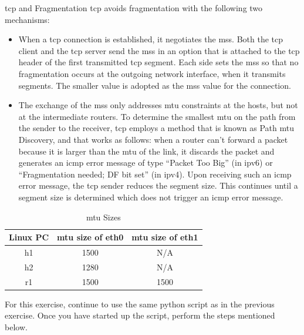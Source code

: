 \begin{exercise}{\ac{tcp} and Fragmentation}
\ac{tcp} avoids fragmentation with the following two mechanisms:

\begin{itemize}
	\item When a \ac{tcp} connection is established, it negotiates the \acf{mss}. Both the \ac{tcp} client and the \ac{tcp} server send the \ac{mss} in an option that is attached to the \ac{tcp} header of the first transmitted \ac{tcp} segment. Each side sets the \ac{mss} so that no fragmentation occurs at the outgoing network interface, when it transmits segments. The smaller value is adopted as the \ac{mss} value for the connection.
	\item The exchange of the \ac{mss} only addresses \ac{mtu} constraints at the hosts, but not at the intermediate routers. To determine the smallest \ac{mtu} on the path from the sender to the receiver, \ac{tcp} employs a method that is known as Path \ac{mtu} Discovery, and that works as follows: when a router can't forward a packet because it is larger than the \ac{mtu} of the link, it discards the packet and generates an \ac{icmp} error message of type ``Packet Too Big'' (in \acs{ipv6}) or ``Fragmentation needed; DF bit set'' (in \acs{ipv4}). Upon receiving such an \ac{icmp} error message, the \ac{tcp} sender reduces the segment size. This continues until a segment size is determined which does not trigger an \ac{icmp} error message.
\end{itemize}

\begin{table}[ht]
	\centering
	\begin{tabular}{ | c | c | c | }	
		\hline
		\textbf{Linux PC} & \textbf{\ac{mtu} size of eth0} & \textbf{\ac{mtu} size of eth1} \\ \hline
		h1 & 1500 & N/A \\ 
		h2 & 1280 & N/A \\
		r1 & 1500 & 1500 \\ \hline
	\end{tabular}
	\caption{\ac{mtu} Sizes}
	\label{tab:lab5-mtus}
\end{table}

For this exercise, continue to use the same python script as in the previous exercise. Once you have started up the script, perform the steps mentioned below.


\end{exercise}
